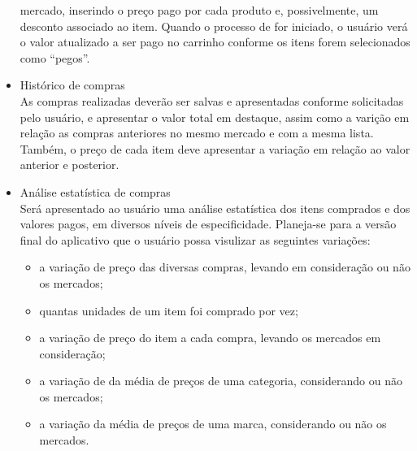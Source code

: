 \begin{itemize}
  mercado, inserindo o preço pago por cada produto e, possivelmente,
  um desconto associado ao item. Quando o processo de for iniciado, o
  usuário verá o valor atualizado a ser pago no carrinho conforme os
  itens forem selecionados como ``pegos''.
\item Histórico de compras\\
  As compras realizadas deverão ser salvas e apresentadas conforme
  solicitadas pelo usuário, e apresentar o valor total em destaque, assim como a
  varição em relação as compras anteriores no mesmo mercado e com a
  mesma lista. Também, o preço de cada item deve apresentar a variação
  em relação ao valor anterior e posterior.
\item Análise estatística de compras\\
  Será apresentado ao usuário uma análise estatística dos itens
  comprados e dos valores pagos, em diversos níveis de
  especificidade. Planeja-se para a versão final do aplicativo que o
  usuário possa visulizar as seguintes variações:
  \begin{itemize}
  \item a variação de preço das diversas compras, levando em
    consideração ou não os mercados;
  \item quantas unidades de um item foi comprado por vez;
  \item a variação de preço do item a cada compra, levando os mercados
    em consideração;
  \item a variação de da média de preços de uma categoria,
    considerando ou não os mercados;
  \item a variação da média de preços de uma marca, considerando ou
    não os mercados.
  \end{itemize}
\end{itemize}

